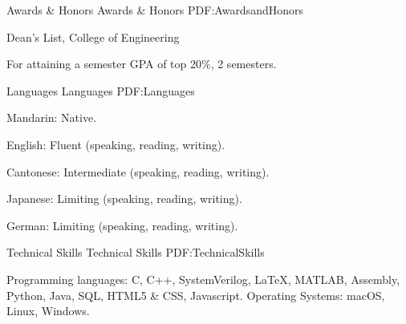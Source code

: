 \documentclass[letterpaper,MMMyyyy,nonstopmode]{simpleresumecv}
\begin{document}
\begin{Body}

\Section
{Awards \& Honors}
{Awards \& Honors}
{PDF:AwardsandHonors}

\BulletItem
Dean's List,
College of Engineering
\hfill
\begin{Detail}
\Item
For attaining a semester GPA of top 20\%, 2 semesters.
\end{Detail}


\Section
{Languages}
{Languages}
{PDF:Languages}

\BulletItem
Mandarin: Native.

\Gap
\BulletItem
English: Fluent (speaking, reading, writing).

\Gap
\BulletItem
Cantonese: Intermediate (speaking, reading, writing).

\Gap
\BulletItem
Japanese: Limiting (speaking, reading, writing).

\Gap
\BulletItem
German: Limiting (speaking, reading, writing).


\Section
{Technical Skills}
{Technical Skills}
{PDF:TechnicalSkills}

\Entry
\BulletItem
Programming languages: C, C++, SystemVerilog, {\LaTeX}, MATLAB, Assembly, Python, Java, SQL, HTML5 \& CSS, Javascript.
\BulletItem
Operating Systems: macOS, Linux, Windows.

\end{Body}
\end{document}
